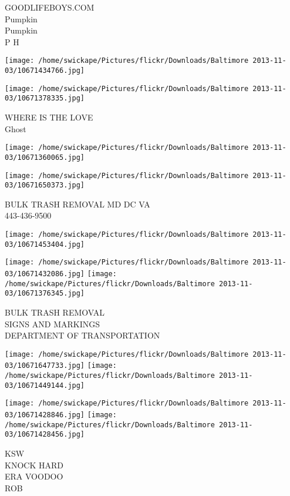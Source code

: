 \documentclass[10pt,letterpaper]{article}
\begin{document}
GOODLIFEBOYS.COM\\
Pumpkin\\
Pumpkin\\
P H\\
\pagebreak

\texttt{[image: /home/swickape/Pictures/flickr/Downloads/Baltimore 2013-11-03/10671434766.jpg]}

\vspace{0.25in}
\texttt{[image: /home/swickape/Pictures/flickr/Downloads/Baltimore 2013-11-03/10671378335.jpg]}

WHERE IS THE LOVE\\
Ghost\\
\pagebreak

\texttt{[image: /home/swickape/Pictures/flickr/Downloads/Baltimore 2013-11-03/10671360065.jpg]}

\vspace{0.25in}
\texttt{[image: /home/swickape/Pictures/flickr/Downloads/Baltimore 2013-11-03/10671650373.jpg]}

BULK TRASH REMOVAL MD DC VA\\
443{-}436{-}9500\\
\pagebreak

\texttt{[image: /home/swickape/Pictures/flickr/Downloads/Baltimore 2013-11-03/10671453404.jpg]}

\vspace{0.25in}
\texttt{[image: /home/swickape/Pictures/flickr/Downloads/Baltimore 2013-11-03/10671432086.jpg]}
\texttt{[image: /home/swickape/Pictures/flickr/Downloads/Baltimore 2013-11-03/10671376345.jpg]}

BULK TRASH REMOVAL\\
SIGNS AND MARKINGS\\
DEPARTMENT OF TRANSPORTATION\\
\pagebreak

\texttt{[image: /home/swickape/Pictures/flickr/Downloads/Baltimore 2013-11-03/10671647733.jpg]}
\texttt{[image: /home/swickape/Pictures/flickr/Downloads/Baltimore 2013-11-03/10671449144.jpg]}

\texttt{[image: /home/swickape/Pictures/flickr/Downloads/Baltimore 2013-11-03/10671428846.jpg]}
\texttt{[image: /home/swickape/Pictures/flickr/Downloads/Baltimore 2013-11-03/10671428456.jpg]}

KSW\\
KNOCK HARD\\
ERA VOODOO\\
ROB\\
\pagebreak
\end{document}
